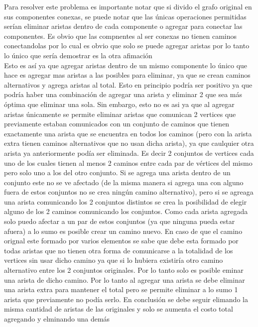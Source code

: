 Para resolver este problema es importante notar que si divido el grafo original en sus componentes conexas, se puede notar que las únicas operaciones permitidas serían eliminar aristas dentro de cada componente o agregar para conectar las componentes. Es obvio que las compnentes al ser conexas no tienen caminos conectandolas por lo cual es obvio que solo se puede agregar aristas por lo tanto lo único que sería demostrar es la otra afimación\\
 Esto es así ya que agregar aristas dentro de un mismo componente lo único que hace es agregar mas aristas a las posibles para eliminar, ya que se crean caminos alternativos y agrega aristas al total. Esto en principio podría ser positivo ya que podría haber una combinación de agregar una arista y eliminar 2 que sea más óptima que eliminar una sola. Sin embargo, esto no es asi ya que al agregar aristas únicamente se permite eliminar aristas que comunican 2 vertices que previamente estaban comunicados con un conjunto de caminos que tienen exactamente una arista que se encuentra en todos los caminos (pero con la arista extra tienen caminos alternativos que no usan dicha arista), ya que caulquier otra arista ya anteriormente podía ser eliminada. Es decir 2 conjuntos de vertices cada uno de los cuales tienen al menos 2 caminos entre cada par de vértices del mismo pero solo uno a los del otro conjunto. Si se agrega una arista dentro de un conjunto este no se ve afectado (de la misma manera si agrega una con alguno fuera de estos conjuntos no se crea ningún camino alternativo), pero si se agreaga una arista comunicando los 2 conjuntos distintos se crea la posibilidad de elegir alguno de los 2 caminos comunicando los conjuntos. Como cada arista agregada solo puedo afectar a un par de estos conjuntos (ya que ninguna pueda estar afuera) a lo sumo es posible crear un camino nuevo. En caso de que el camino orignal este formado por varios elementos se sabe que debe esta formado por todas aristas que no tienen otra forma de comunicarse a la totalidad de los vertices sin usar dicho camino ya que si lo hubiera existiría otro camino alternativo entre los 2 conjuntos originales. Por lo tanto solo es posible eminar una arista de dicho camino. Por lo tanto al agregar una arista se debe eliminar una arista extra para mantener el total pero se permite eliminar a lo sumo 1 arista que previamente no podía serlo. En conclusión se debe seguir elimando la misma cantidad de aristas de las originales y solo se aumenta el costo total agregando y elminando una demás \\
